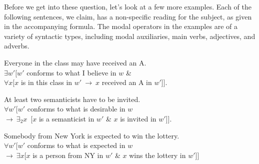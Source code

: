 Before we get into these question, let's look at a few more examples. Each of
the following sentences, we claim, has a non-specific reading for the subject,
as given in the accompanying formula. The modal operators in the examples are of
a variety of syntactic types, including modal auxiliaries, main verbs,
adjectives, and adverbs.

\ex\label{everymay} Everyone in the class may have received an A.\\
$\exists w'[w'$ conforms to what I believe in $w$ \&\\
\null\hfill$\forall x[x$ is in this class in $w'\ \rightarrow\ x$ received an A in $w'$]].\xe

\ex At least two semanticists have to be invited.\\
$\forall w'[w'$ conforms to what is desirable in $w$\\
\null\hfill$ \rightarrow\ \exists_2 x$\ [$x$ is a semanticist in $w'$ \& $x$ is invited in $w'$]].\xe

\ex\label{ny} Somebody from New York is expected to win the lottery.\\
$\forall w'[w'$ conforms to what is expected in $w$\\
\null\hfill$ \rightarrow\ \exists x[x$ is a person from NY in $w'$ \& $x$ wins the lottery in $w'$]]\xe

